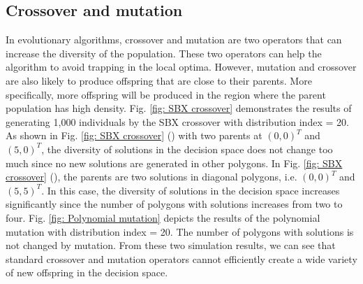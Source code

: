 \documentclass[conference]{IEEEtran}
\begin{document}
\subsection{Crossover and mutation}
In evolutionary algorithms, crossover and mutation are two operators that can increase the diversity of the population. These two operators can help the algorithm to avoid trapping in the local optima. However, mutation and crossover are also likely to produce offspring that are close to their parents. More specifically, more offspring will be produced in the region where the parent population has high density. Fig. \ref{fig: SBX crossover} demonstrates the results of generating 1,000 individuals by the SBX\cite{deb1995simulated} crossover with distribution index = 20. As shown in Fig. \ref{fig: SBX crossover} () with two parents at $(0, 0)^T$ and $(5, 0)^T$, the diversity of solutions in the decision space does not change too much since no new solutions are generated in other polygons. In Fig. \ref{fig: SBX crossover} (), the parents are two solutions in diagonal polygons, i.e. $(0, 0)^T$ and $(5, 5)^T$. In this case, the diversity of solutions in the decision space increases significantly since the number of polygons with solutions increases from two to four. Fig. \ref{fig: Polynomial mutation} depicts the results of the polynomial mutation \cite{deb2014analysing} with distribution index = 20. The number of polygons with solutions is not changed by mutation. From these two simulation results, we can see that standard crossover and mutation operators cannot efficiently create a wide variety of new offspring in the decision space.
\end{document}
